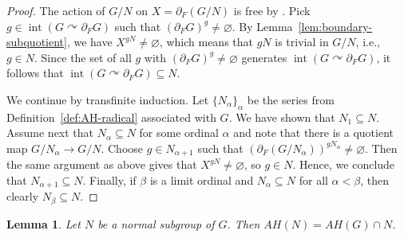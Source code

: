 \documentclass[a4paper]{amsart}
\theoremstyle{plain}
\newtheorem{lemma}[theorem]{Lemma}
\theoremstyle{definition}
\theoremstyle{remark}
\numberwithin{theorem}{section}
\begin{document}
\begin{proof}
The action of $G/N$ on $X=\partial_F(G/N)$ is free by \cite[Theorem~6.2]{KK}.
Pick $g\in\operatorname{int}(G\curvearrowright\partial_F G)$ such that $(\partial_F G)^g\neq\varnothing$.
By Lemma~\ref{lem:boundary-subquotient}, we have $X^{gN}\neq\varnothing$, which means that $gN$ is trivial in $G/N$, i.e., $g\in N$.
Since the set of all $g$ with $(\partial_F G)^g\neq\varnothing$ generates $\operatorname{int}(G\curvearrowright\partial_F G)$,
it follows that $\operatorname{int}(G\curvearrowright\partial_F G)\subseteq N$.

We continue by transfinite induction.
Let $\{N_\alpha\}_\alpha$ be the series from Definition~\ref{def:AH-radical} associated with $G$.
We have shown that $N_1\subseteq N$.
Assume next that $N_\alpha\subseteq N$ for some ordinal $\alpha$ and note that there is a quotient map $G/N_\alpha\to G/N$.
Choose $g\in N_{\alpha+1}$ such that $(\partial_F(G/N_\alpha))^{gN_\alpha}\neq\varnothing$.
Then the same argument as above gives that $X^{gN}\neq\varnothing$, so $g\in N$.
Hence, we conclude that $N_{\alpha+1}\subseteq N$.
Finally, if $\beta$ is a limit ordinal and $N_\alpha\subseteq N$ for all $\alpha<\beta$, then clearly $N_\beta\subseteq N$.
\end{proof}

\begin{lemma}\label{lem:normal-aish}
Let $N$ be a normal subgroup of $G$.
Then $AH(N)=AH(G)\cap N$.
\end{lemma}
\end{document}
